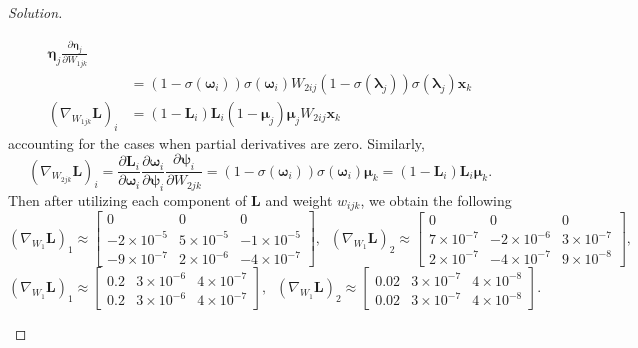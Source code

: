 \documentclass[ 12pt ]{article}
\begin{document}
\begin{enumerate}
\begin{proof}[Solution]
\begin{enumerate}
\begin{align*}
{						\pmb{\eta}_j} \frac{\partial \pmb{\eta}_j}{\partial W_{1jk}} \\
						&= (1 - \sigma(\pmb{\omega}_i))\sigma(\pmb{\omega}_i) W_{2ij}(1 - \sigma(\pmb{\lambda}_j)) \sigma(\pmb{\lambda}_j) \textbf{x}_k \\
						(\nabla_{W_{1jk}} \textbf{L})_i &= (1 - \textbf{L}_i)\textbf{L}_i(1 - \pmb{\mu}_j)\pmb{\mu}_j W_{2ij}\textbf{x}_k
					\end{align*} accounting for the cases when partial derivatives are zero. Similarly, $$(\nabla_{W_{2jk}} \textbf{L})_i = \frac{\partial
					\textbf{L}_i}{\partial \pmb{\omega}_i} \frac{\partial \pmb{\omega}_i}{\partial \pmb{\psi}_i} \frac{\partial \pmb{\psi}_i}{\partial  W_{2jk}} =
					(1 - \sigma(\pmb{\omega}_i))\sigma(\pmb{\omega}_i)\pmb{\mu}_k = (1 - \textbf{L}_i)\textbf{L}_i \pmb{\mu}_k.$$
					Then after utilizing each component of $\textbf{L}$ and weight $w_{ijk}$, we obtain the following
					$$(\nabla_{W_1} \textbf{L})_1 \approx \begin{bmatrix} 0 & 0 & 0 \\ -2 \times 10^{-5} & 5 \times 10^{-5} & -1 \times 10^{-5} \\ -9 \times 10^{-7} & 2 \times 10^{-6} &
					-4 \times 10^{-7} \end{bmatrix},\;\; (\nabla_{W_1} \textbf{L})_2 \approx \begin{bmatrix} 0 & 0 & 0 \\ 7 \times 10^{-7} & -2 \times 10^{-6} & 3 \times 10^{-7} \\ 2 \times
					10^{-7} & -4 \times 10^{-7} & 9 \times 10^{-8} \end{bmatrix},$$
					$$(\nabla_{W_1} \textbf{L})_1 \approx \begin{bmatrix} 0.2 & 3 \times 10^{-6} & 4 \times 10^{-7} \\ 0.2 & 3 \times 10^{-6} & 4 \times 10^{-7} \end{bmatrix},\;\;
					(\nabla_{W_1} \textbf{L})_2 \approx \begin{bmatrix} 0.02 & 3 \times 10^{-7} & 4 \times 10^{-8} \\ 0.02 & 3 \times 10^{-7} & 4 \times 10^{-8} \end{bmatrix}.$$
			\end{enumerate}
		\end{proof}



\end{enumerate}
\end{document}

